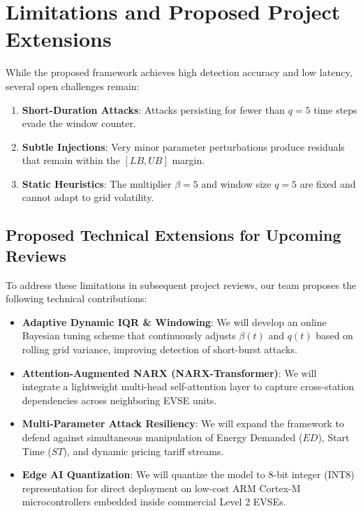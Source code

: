\documentclass[conference]{IEEEtran}
\begin{document}
\section{Limitations and Proposed Project Extensions}
While the proposed framework achieves high detection accuracy and low latency, several open challenges remain:
\begin{enumerate}
    \item \textbf{Short-Duration Attacks}: Attacks persisting for fewer than $q = 5$ time steps evade the window counter.
    \item \textbf{Subtle Injections}: Very minor parameter perturbations produce residuals that remain within the $[LB, UB]$ margin.
    \item \textbf{Static Heuristics}: The multiplier $\beta = 5$ and window size $q = 5$ are fixed and cannot adapt to grid volatility.
\end{enumerate}

\subsection{Proposed Technical Extensions for Upcoming Reviews}
To address these limitations in subsequent project reviews, our team proposes the following technical contributions:
\begin{itemize}
    \item \textbf{Adaptive Dynamic IQR \& Windowing}: We will develop an online Bayesian tuning scheme that continuously adjusts $\beta(t)$ and $q(t)$ based on rolling grid variance, improving detection of short-burst attacks.
    \item \textbf{Attention-Augmented NARX (NARX-Transformer)}: We will integrate a lightweight multi-head self-attention layer to capture cross-station dependencies across neighboring EVSE units.
    \item \textbf{Multi-Parameter Attack Resiliency}: We will expand the framework to defend against simultaneous manipulation of Energy Demanded ($ED$), Start Time ($ST$), and dynamic pricing tariff streams.
    \item \textbf{Edge AI Quantization}: We will quantize the model to 8-bit integer (INT8) representation for direct deployment on low-cost ARM Cortex-M microcontrollers embedded inside commercial Level 2 EVSEs.
\end{itemize}
\end{document}
